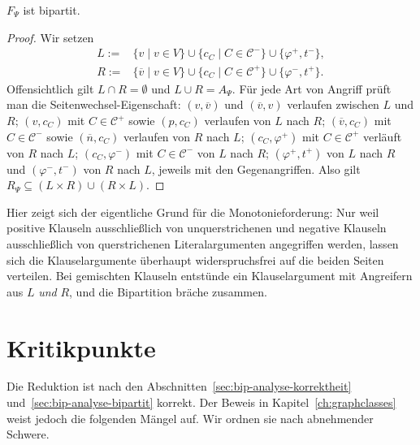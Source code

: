 \begin{Proposition}
    \label{prop:bip-korrekt-bipartit}
    \(F_\Psi\) ist bipartit.
\end{Proposition}

\begin{proof}
    Wir setzen
    \[
    \begin{aligned}
        L:={}& \{v\mid v\in V\}\cup\{c_C\mid C\in\mathcal{C}^{-}\}
              \cup\{\varphi^{+},t^{-}\},\\
        R:={}& \{\overline{v}\mid v\in V\}\cup\{c_C\mid C\in\mathcal{C}^{+}\}
              \cup\{\varphi^{-},t^{+}\}.
    \end{aligned}
    \]
    Offensichtlich gilt \(L\cap R=\emptyset\) und \(L\cup R=A_\Psi\). Für jede
    Art von Angriff prüft man die Seitenwechsel-Eigenschaft:
    \((v,\overline{v})\) und \((\overline{v},v)\) verlaufen zwischen \(L\) und
    \(R\); \((v,c_C)\) mit \(C\in\mathcal{C}^{+}\) sowie \((p,c_C)\) verlaufen
    von \(L\) nach \(R\); \((\overline{v},c_C)\) mit \(C\in\mathcal{C}^{-}\)
    sowie \((\overline{n},c_C)\) verlaufen von \(R\) nach \(L\);
    \((c_C,\varphi^{+})\) mit \(C\in\mathcal{C}^{+}\) verläuft von \(R\) nach
    \(L\); \((c_C,\varphi^{-})\) mit \(C\in\mathcal{C}^{-}\) von \(L\) nach
    \(R\); \((\varphi^{+},t^{+})\) von \(L\) nach \(R\) und
    \((\varphi^{-},t^{-})\) von \(R\) nach \(L\), jeweils mit den
    Gegenangriffen. Also gilt
    \(R_\Psi\subseteq(L\times R)\cup(R\times L)\).
\end{proof}

Hier zeigt sich der eigentliche Grund für die Monotonieforderung: Nur weil
positive Klauseln ausschließlich von unquerstrichenen und negative Klauseln
ausschließlich von querstrichenen Literalargumenten angegriffen werden, lassen
sich die Klauselargumente überhaupt widerspruchsfrei auf die beiden Seiten
verteilen. Bei gemischten Klauseln entstünde ein Klauselargument mit Angreifern
aus \(L\) \emph{und} \(R\), und die Bipartition bräche zusammen.

\section{Kritikpunkte}
\label{sec:bip-analyse-kritik}

Die Reduktion ist nach den Abschnitten~\ref{sec:bip-analyse-korrektheit}
und~\ref{sec:bip-analyse-bipartit} korrekt. Der Beweis in
Kapitel~\ref{ch:graphclasses} weist jedoch die folgenden Mängel auf. Wir
ordnen sie nach abnehmender Schwere.


